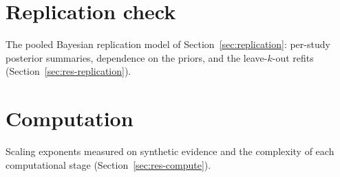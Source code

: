 \documentclass[11pt,a4paper]{article}
\begin{document}
\clearpage
\section{Replication check}\label{sec:S-rep}
The pooled Bayesian replication model of Section~\ref{sec:replication}: per-study posterior summaries, dependence on the priors, and the leave-$k$-out refits (Section~\ref{sec:res-replication}).





\clearpage
\section{Computation}\label{sec:S-compute}
Scaling exponents measured on synthetic evidence and the complexity of each computational stage (Section~\ref{sec:res-compute}).




\clearpage

\end{document}
